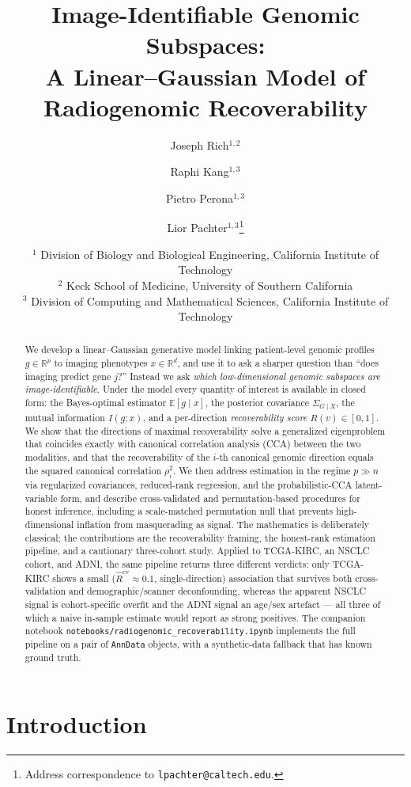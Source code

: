 \documentclass{article}
\title{Image-Identifiable Genomic Subspaces:\\
A Linear--Gaussian Model of Radiogenomic Recoverability}
\author{
Joseph Rich$^{1,2}$ \and
Raphi Kang$^{1,3}$ \and
Pietro Perona$^{1,3}$ \and
Lior Pachter$^{1,3}$\thanks{Address correspondence to \texttt{lpachter@caltech.edu}.}
}
\date{
\small
$^1$ Division of Biology and Biological Engineering, California Institute of Technology\\
$^2$ Keck School of Medicine, University of Southern California\\
$^3$ Division of Computing and Mathematical Sciences, California Institute of Technology
}
\newcommand{\R}{\mathbb{R}}
\newcommand{\E}{\mathbb{E}}
\newcommand{\Sgcx}{\Sigma_{G\mid X}}
\begin{document}
\maketitle

\begin{abstract}
We develop a linear--Gaussian generative model linking patient-level genomic
profiles $g \in \R^{p}$ to imaging phenotypes $x \in \R^{d}$, and use it to ask
a sharper question than ``does imaging predict gene $j$?'' Instead we ask
\emph{which low-dimensional genomic subspaces are image-identifiable}. Under the
model every quantity of interest is available in closed form: the Bayes-optimal
estimator $\E[g \mid x]$, the posterior covariance $\Sgcx$, the mutual
information $I(g;x)$, and a per-direction \emph{recoverability score}
$R(v) \in [0,1]$. We show that the directions of maximal recoverability solve a
generalized eigenproblem that coincides exactly with canonical correlation
analysis (CCA) between the two modalities, and that the recoverability of the
$i$-th canonical genomic direction equals the squared canonical correlation
$\rho_i^2$. We then address estimation in the regime $p \gg n$ via regularized
covariances, reduced-rank regression, and the probabilistic-CCA latent-variable
form, and describe cross-validated and permutation-based procedures for honest
inference, including a scale-matched permutation null that prevents
high-dimensional inflation from masquerading as signal. The mathematics is
deliberately classical; the contributions are the recoverability framing, the
honest-rank estimation pipeline, and a cautionary three-cohort study. Applied to
TCGA-KIRC, an NSCLC cohort, and ADNI, the same pipeline returns three different
verdicts: only TCGA-KIRC shows a small ($\hat R^{\mathrm{cv}}\approx 0.1$,
single-direction) association that survives both cross-validation and
demographic/scanner deconfounding, whereas the apparent NSCLC signal is
cohort-specific overfit and the ADNI signal an age/sex artefact --- all three of
which a naive in-sample estimate would report as strong positives. The companion
notebook \texttt{notebooks/radiogenomic\_recoverability.ipynb} implements the full
pipeline on a pair of \texttt{AnnData} objects, with a synthetic-data fallback
that has known ground truth.
\end{abstract}


\section{Introduction}
\label{sec:intro}
\end{document}
